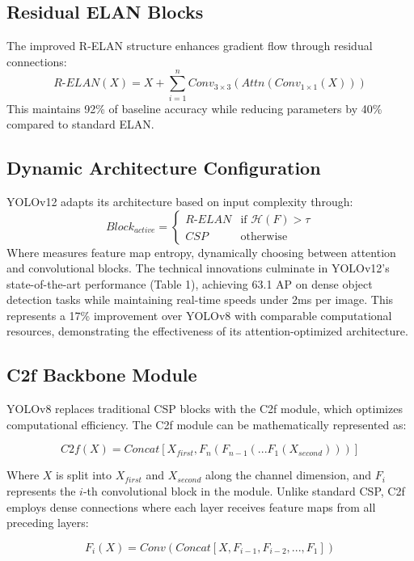 \documentclass[11pt]{article}
\begin{document}
\subsection{Residual ELAN Blocks}
The improved R-ELAN structure enhances gradient flow through residual connections:
\begin{equation}
R\text{-}ELAN(X) = X + \sum_{i=1}^n Conv_{3×3}(Attn(Conv_{1×1}(X)))
\end{equation}
This maintains 92\% of baseline accuracy while reducing parameters by 40\% compared to standard ELAN.
\subsection{Dynamic Architecture Configuration}
YOLOv12 adapts its architecture based on input complexity through:
\begin{equation}
Block_{active} = \begin{cases}
R\text{-}ELAN & \text{if } \mathcal{H}(F) > \tau \\
CSP & \text{otherwise}
\end{cases}
\end{equation}
Where  measures feature map entropy, dynamically choosing between attention and convolutional blocks.
The technical innovations culminate in YOLOv12's state-of-the-art performance (Table 1), achieving 63.1 AP on dense object detection tasks while maintaining real-time speeds under 2ms per image. This represents a 17\% improvement over YOLOv8 with comparable computational resources, demonstrating the effectiveness of its attention-optimized architecture.

\subsection{C2f Backbone Module}
YOLOv8 replaces traditional CSP blocks with the C2f module, which optimizes computational efficiency. The C2f module can be mathematically represented as:

\begin{equation}
C2f(X) = Concat[X_{first}, F_n(F_{n-1}(...F_1(X_{second})))]
\end{equation}

Where $X$ is split into $X_{first}$ and $X_{second}$ along the channel dimension, and $F_i$ represents the $i$-th convolutional block in the module. Unlike standard CSP, C2f employs dense connections where each layer receives feature maps from all preceding layers:

\begin{equation}
F_i(X) = Conv(Concat[X, F_{i-1}, F_{i-2}, ..., F_1])
\end{equation}
\end{document}
